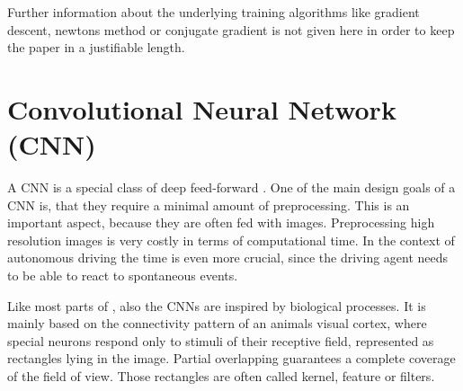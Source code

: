 Further information about the underlying training algorithms like gradient descent, newtons method or conjugate gradient \cite{rojas2013theorie} is not given here in order to keep the paper in a justifiable length.  


\section{Convolutional Neural Network (CNN)}\label{sec:CNN}

A CNN is a special class of deep feed-forward \nns. One of the main design goals of a CNN is, that they require a minimal amount of preprocessing. This is an important aspect, because they are often fed with images. Preprocessing high resolution images is very costly in terms of computational time. In the context of autonomous driving the time is even more crucial, since the driving agent needs to be able to react to spontaneous events.

Like most parts of \nns, also the CNNs are inspired by biological processes. It is mainly based on the connectivity pattern of an animals visual cortex, where special neurons respond only to stimuli of their receptive field, represented as rectangles lying in the image. Partial overlapping guarantees a complete coverage of the field of view. Those rectangles are often called kernel, feature or filters.\cite{matsugu2003subject}



